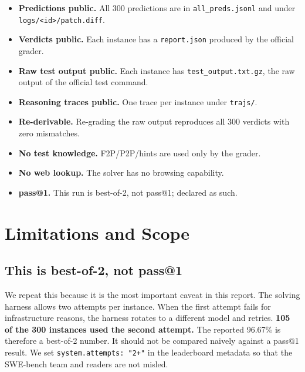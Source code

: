 \documentclass[11pt,a4paper]{article}
\begin{document}
\begin{itemize}[leftmargin=1.4em]
  \item[\checkmark] \textbf{Predictions public.} All 300 predictions are in
  \texttt{all\_preds.jsonl} and under \texttt{logs/<id>/patch.diff}.
  \item[\checkmark] \textbf{Verdicts public.} Each instance has a \texttt{report.json}
  produced by the official grader.
  \item[\checkmark] \textbf{Raw test output public.} Each instance has
  \texttt{test\_output.txt.gz}, the raw output of the official test command.
  \item[\checkmark] \textbf{Reasoning traces public.} One trace per instance under
  \texttt{trajs/}.
  \item[\checkmark] \textbf{Re-derivable.} Re-grading the raw output reproduces all 300
  verdicts with zero mismatches.
  \item[\checkmark] \textbf{No test knowledge.} F2P/P2P/hints are used only by the grader.
  \item[\checkmark] \textbf{No web lookup.} The solver has no browsing capability.
  \item[\texttimes] \textbf{pass@1.} This run is best-of-2, not pass@1; declared as such.
\end{itemize}

\section{Limitations and Scope}
\label{sec:limitations}

\subsection{This is best-of-2, not pass@1}

We repeat this because it is the most important caveat in this report. The solving
harness allows two attempts per instance. When the first attempt fails for infrastructure
reasons, the harness rotates to a different model and retries. \textbf{105 of the 300
instances used the second attempt.} The reported 96.67\% is therefore a best-of-2 number.
It should not be compared naively against a pass@1 result. We set
\texttt{system.attempts: "2+"} in the leaderboard metadata so that the SWE-bench team and
readers are not misled.
\end{document}
